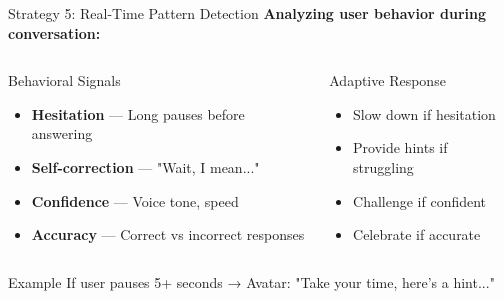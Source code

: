 \documentclass[aspectratio=169]{beamer}
\begin{document}
\begin{frame}{Strategy 5: Real-Time Pattern Detection}
\textbf{Analyzing user behavior during conversation:}

\vspace{0.3cm}

\begin{columns}[T]
\begin{block}{Behavioral Signals}
\begin{itemize}
    \item \textbf{Hesitation} — Long pauses before answering
    \item \textbf{Self-correction} — "Wait, I mean..."
    \item \textbf{Confidence} — Voice tone, speed
    \item \textbf{Accuracy} — Correct vs incorrect responses
\end{itemize}
\end{block}

\begin{block}{Adaptive Response}
\begin{itemize}
    \item Slow down if hesitation
    \item Provide hints if struggling
    \item Challenge if confident
    \item Celebrate if accurate
\end{itemize}
\end{block}
\end{columns}

\vspace{0.3cm}

\begin{alertblock}{Example}
If user pauses 5+ seconds → Avatar: "Take your time, here's a hint..."
\end{alertblock}
\end{frame}
\end{document}
